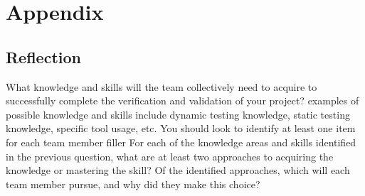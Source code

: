 \documentclass[12pt]{article}
\begin{document}

					
					
					
					





				




\newpage

\section{Appendix}

\subsection{Reflection}
\begin{outline}[enumerate]
  \1 What knowledge and skills will the team collectively need to acquire to successfully complete the verification and validation of your project?
  examples of possible knowledge and skills include dynamic testing knowledge, static testing knowledge, specific tool usage, etc. You should look to
  identify at least one item for each team member
    \2 filler
  \1 For each of the knowledge areas and skills identified in the previous question, what are at least two approaches to acquiring the knowledge or
  mastering the skill? Of the identified approaches, which will each team member pursue, and why did they make this choice?
\end{outline}
\end{document}
